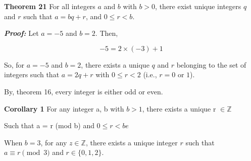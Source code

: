 \documentclass[12 pt]{article}        	%
\newcommand{\eqn}[0]{\begin{array}{rcl}}%
\newcommand{\eqnend}[0]{\end{array} }  	%
\newcommand{\qed}[0]{$\square$}        	%
\begin{document}

                                   



\textbf{Theorem 21}							%
For all integers $a$ and $b$ with $b > 0$, there exist unique integers $q$ and $r$ such that $a = bq + r$, and $0 \leq r < b$.

\emph{\textbf{Proof:}}   
Let $a = -5$ and $b = 2$. Then,

\[
-5 = 2 \times (-3) + 1
\]

So, for $a = -5$ and $b = 2$, there exists a unique $q$ and $r$ belonging to the set of integers such that $a = 2q + r$ with $0 \leq r < 2$ (i.e., $r = 0$ or $1$).

By, theorem 16, every integer is either odd or even.

\textbf{Corollary 1} 
For any integer a, b with $b > 1$, there exists a unique r $\in \mathbb{Z}$

Such that a = r (mod b) and $0 \leq r < be$

When $b = 3$, for any $z \in \mathbb{Z}$, there exists a unique integer $r$ such that $a \equiv r \pmod{3}$ and $r \in \{0, 1, 2\}$.

\newpage
\end{document}
